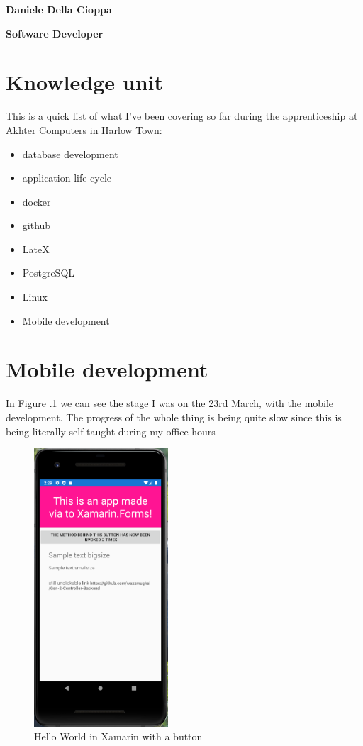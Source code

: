 \documentclass[a4paper,12pt]{article}
\begin{document}
\textbf{Daniele Della Cioppa}

\textbf{Software Developer}

\tableofcontents
\clearpage

\section{Knowledge unit}

This is a quick list of what I've been covering so far during the apprenticeship at Akhter Computers in Harlow Town:

\begin{itemize}
\item {database development}
\item {application life cycle}
\item docker
\item github 
\item LateX
\item PostgreSQL
\item Linux
\item {Mobile development}
\end{itemize}
\clearpage

\section{Mobile development}

In Figure .1 we can see the stage I was on the 23rd March, with the mobile development. The progress of the whole thing is being quite slow since this is being literally self taught during my office hours

\begin{figure}
\includegraphics[width=5cm]{./capture-app.PNG}
\caption{Hello World in Xamarin with a button\footnotemark{}}\label{wrap-fig:1}
\end{figure} 
\end{document}
